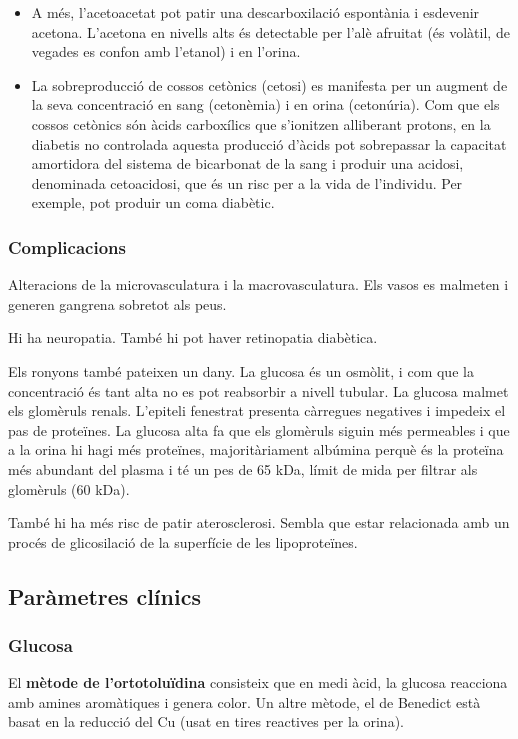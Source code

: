 \begin{itemize}
\item A més, l’acetoacetat pot patir una descarboxilació espontània i
  esdevenir acetona. L’acetona en nivells alts és detectable per l’alè
  afruitat (és volàtil, de vegades es confon amb l’etanol) i en
  l’orina.

\item La sobreproducció de cossos cetònics (cetosi) es manifesta per
  un augment de la seva concentració en sang (cetonèmia) i en orina
  (cetonúria). Com que els cossos cetònics són àcids carboxílics que
  s’ionitzen alliberant protons, en la diabetis no controlada aquesta
  producció d’àcids pot sobrepassar la capacitat amortidora del
  sistema de bicarbonat de la sang i produir una acidosi, denominada
  cetoacidosi, que és un risc per a la vida de l’individu. Per
  exemple, pot produir un coma diabètic. 
\end{itemize}

\subsubsection{Complicacions}
\label{sec:complicacions}
Alteracions de la microvasculatura i la macrovasculatura. Els vasos es
malmeten i generen gangrena sobretot als peus.

Hi ha neuropatia. També hi pot haver retinopatia diabètica.

Els ronyons també pateixen un dany. La glucosa és un osmòlit, i com
que la concentració és tant alta no es pot reabsorbir a nivell
tubular. La glucosa malmet els glomèruls renals. L'epiteli fenestrat
presenta càrregues negatives i impedeix el pas de proteïnes. La
glucosa alta fa que els glomèruls siguin més permeables i que a la
orina hi hagi més proteïnes, majoritàriament albúmina perquè és la
proteïna més abundant del plasma i té un pes de 65 kDa, límit de mida
per filtrar als glomèruls (60 kDa).

També hi ha més risc de patir aterosclerosi. Sembla que estar
relacionada amb un procés de glicosilació de la superfície de les
lipoproteïnes.

\subsection{Paràmetres clínics}
\label{sec:parametres-clinics}

\subsubsection{Glucosa}
\label{sec:glucosa}
El \textbf{mètode de l'ortotoluïdina} consisteix que en medi àcid, la glucosa
reacciona amb amines aromàtiques i genera color. Un altre mètode, el
de Benedict està basat en la reducció del Cu (usat en tires reactives
per la orina).

